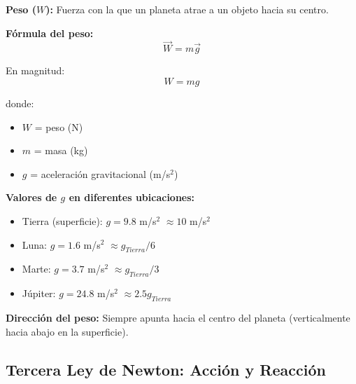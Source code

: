 \begin{seccion}
\begin{definicion}
    \textbf{Peso ($W$):} Fuerza con la que un planeta atrae a un objeto hacia su centro.
\end{definicion}

\begin{ecuacion}
\textbf{Fórmula del peso:}
$$\vec{W} = m\vec{g}$$

En magnitud:
$$W = mg$$

donde:
\begin{itemize}
    \item $W$ = peso (N)
    \item $m$ = masa (kg)
    \item $g$ = aceleración gravitacional (m/s$^2$)
\end{itemize}
\end{ecuacion}

\textbf{Valores de $g$ en diferentes ubicaciones:}
\begin{itemize}
    \item Tierra (superficie): $g = 9.8$ m/s$^2$ $\approx 10$ m/s$^2$
    \item Luna: $g = 1.6$ m/s$^2$ $\approx g_{Tierra}/6$
    \item Marte: $g = 3.7$ m/s$^2$ $\approx g_{Tierra}/3$
    \item Júpiter: $g = 24.8$ m/s$^2$ $\approx 2.5 g_{Tierra}$
\end{itemize}

\begin{definicion}
    \textbf{Dirección del peso:} Siempre apunta hacia el centro del planeta (verticalmente hacia abajo en la superficie).
\end{definicion}

\end{seccion}

\subsection{Tercera Ley de Newton: Acción y Reacción}

